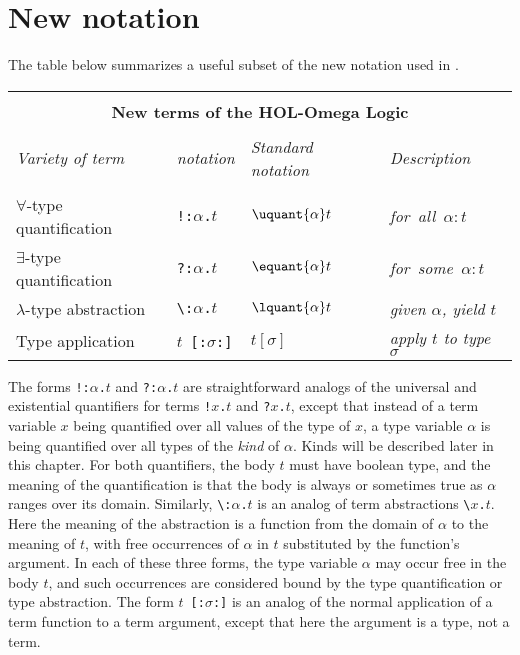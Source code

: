 \section{New notation}

The table below summarizes a useful subset of the new notation used in
\HOLW.

\begin{center}
\begin{tabular}{|l|l|l|l|} \hline
\multicolumn{4}{|c|}{ } \\
\multicolumn{4}{|c|}{\bf New terms of the HOL-Omega Logic} \\
\multicolumn{4}{|c|}{ } \\
{\it Variety of term} & {\it \HOLW{} notation} &
{\it Standard notation} &
{\it Description} \\ \hline
 & & & \\
$\forall$-type quantification & {\small\verb|!:|}$\alpha${\small\verb|.|}$t$ &
$\uquant{\alpha}t$ & {\it for\ all\ }$\alpha: t$ \\ \hline
$\exists$-type quantification & {\small\verb|?:|}$\alpha${\small\verb|.|}$t$ &
$\equant{\alpha}t$ & {\it for\ some\ }$\alpha: t$ \\ \hline
$\lambda$-type abstraction & {\small\verb|\:|}$\alpha${\small\verb|.|}$t$ &
$\lquant{\alpha}t$ & {\it given $\alpha$, yield $t$}\\ \hline
Type application & $t$\ {\small\verb|[:|}$\sigma${\small\verb|:]|} &
$t[\sigma]$ & {\it apply $t$ to type $\sigma$}\\ \hline
\end{tabular}
\end{center}\label{notation-table}

The forms {\small\verb|!:|}$\alpha${\small\verb|.|}$t$
and {\small\verb|?:|}$\alpha${\small\verb|.|}$t$
are straightforward analogs of the universal and existential
quantifiers for terms {\small\verb|!|}$x${\small\verb|.|}$t$
and {\small\verb|?|}$x${\small\verb|.|}$t$,
except that instead of a term variable $x$ being quantified over
all values of the type of $x$, a type variable $\alpha$ is being
quantified over all types of the {\it kind\/} of $\alpha$. Kinds
will be described later in this chapter.
For both quantifiers, the body $t$ must have boolean type, and the
meaning of the quantification is that the body is always or sometimes
true as $\alpha$ ranges over its domain.
Similarly, {\small\verb|\:|}$\alpha${\small\verb|.|}$t$ is an analog of
term abstractions {\small\verb|\|}$x${\small\verb|.|}$t$.
Here the meaning of the abstraction is a function from the domain of
$\alpha$ to the meaning of $t$, with free occurrences of $\alpha$ in $t$
substituted by the function's argument.
In each of these three forms,
the type variable $\alpha$ may occur free in the body $t$,
and such occurrences are considered bound by the type quantification or
type abstraction.
The form $t$\ {\small\verb|[:|}$\sigma${\small\verb|:]|}
is an analog of the normal application of a term function to a term argument,
except that here the argument is a type, not a term.

